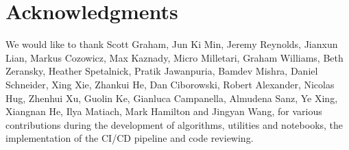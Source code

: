 \section*{Acknowledgments}
We would like to thank Scott Graham, Jun Ki Min, Jeremy Reynolds, Jianxun Lian, 
Markus Cozowicz, Max Kaznady, Micro Milletari, Graham Williams, Beth Zeransky, 
Heather Spetalnick, Pratik Jawanpuria, Bamdev Mishra, Daniel Schneider, Xing Xie,
Zhankui He, Dan Ciborowski, Robert Alexander, Nicolas Hug, Zhenhui Xu, Guolin Ke, 
Gianluca Campanella, Almudena Sanz, Ye Xing, Xiangnan He, Ilya Matiach, 
Mark Hamilton and Jingyan Wang, for various contributions during the development of
algorithms, utilities and notebooks, the implementation of the CI/CD pipeline 
and code reviewing.

